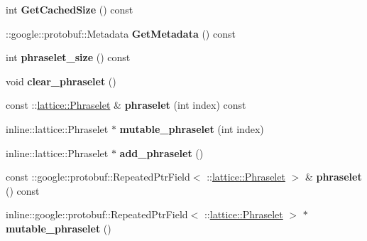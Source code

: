 \begin{DoxyCompactItemize}
\item 
\hypertarget{classlattice_1_1Phraselets_af6446f4c4dc198355a1a0baca9bf7bb2}{
int {\bfseries GetCachedSize} () const }
\label{classlattice_1_1Phraselets_af6446f4c4dc198355a1a0baca9bf7bb2}

\item 
\hypertarget{classlattice_1_1Phraselets_a116d9d068a6bc06ff56b5554d711d108}{
::google::protobuf::Metadata {\bfseries GetMetadata} () const }
\label{classlattice_1_1Phraselets_a116d9d068a6bc06ff56b5554d711d108}

\item 
\hypertarget{classlattice_1_1Phraselets_a53705111afb5bddd6370da7c86809681}{
int {\bfseries phraselet\_\-size} () const }
\label{classlattice_1_1Phraselets_a53705111afb5bddd6370da7c86809681}

\item 
\hypertarget{classlattice_1_1Phraselets_a380bfc60bcdb7de062b5ee48cead27c4}{
void {\bfseries clear\_\-phraselet} ()}
\label{classlattice_1_1Phraselets_a380bfc60bcdb7de062b5ee48cead27c4}

\item 
\hypertarget{classlattice_1_1Phraselets_a211ccfa16e63f8e8f94a37e34cf62995}{
const ::\hyperlink{classlattice_1_1Phraselet}{lattice::Phraselet} \& {\bfseries phraselet} (int index) const }
\label{classlattice_1_1Phraselets_a211ccfa16e63f8e8f94a37e34cf62995}

\item 
\hypertarget{classlattice_1_1Phraselets_ab9c74d12c2f7a1edd628556af8a8b3b5}{
inline::lattice::Phraselet $\ast$ {\bfseries mutable\_\-phraselet} (int index)}
\label{classlattice_1_1Phraselets_ab9c74d12c2f7a1edd628556af8a8b3b5}

\item 
\hypertarget{classlattice_1_1Phraselets_aee454d42c3235fb15fb28b1dd35927bc}{
inline::lattice::Phraselet $\ast$ {\bfseries add\_\-phraselet} ()}
\label{classlattice_1_1Phraselets_aee454d42c3235fb15fb28b1dd35927bc}

\item 
\hypertarget{classlattice_1_1Phraselets_aa3c9f5a4017d5c6a88dc65e283f98164}{
const ::google::protobuf::RepeatedPtrField$<$ ::\hyperlink{classlattice_1_1Phraselet}{lattice::Phraselet} $>$ \& {\bfseries phraselet} () const }
\label{classlattice_1_1Phraselets_aa3c9f5a4017d5c6a88dc65e283f98164}

\item 
\hypertarget{classlattice_1_1Phraselets_afbe87c3601feac1c66c56886e150e14b}{
inline::google::protobuf::RepeatedPtrField$<$ ::\hyperlink{classlattice_1_1Phraselet}{lattice::Phraselet} $>$ $\ast$ {\bfseries mutable\_\-phraselet} ()}
\label{classlattice_1_1Phraselets_afbe87c3601feac1c66c56886e150e14b}

\end{DoxyCompactItemize}
